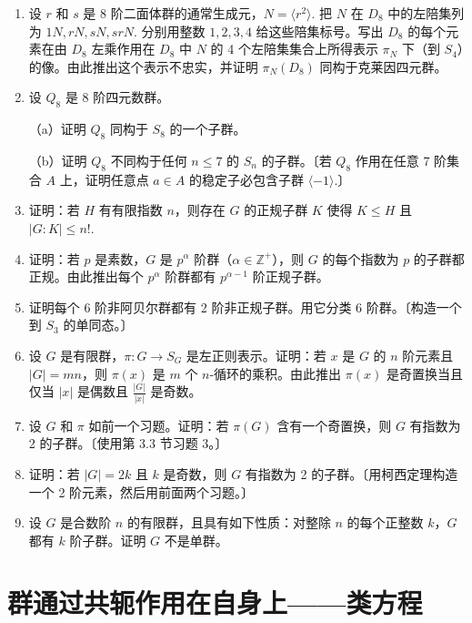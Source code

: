 \begin{enumerate}
\item 设 \(r\) 和 \(s\) 是 8 阶二面体群的通常生成元，\(N = \langle r^2 \rangle\). 把 \(N\) 在 \(D_8\) 中的左陪集列为 \(1N, rN, sN, srN\). 分别用整数 \(1, 2, 3, 4\) 给这些陪集标号。写出 \(D_8\) 的每个元素在由 \(D_8\) 左乘作用在 \(D_8\) 中 \(N\) 的 4 个左陪集集合上所得表示 \(\pi_N\) 下（到 \(S_4\)）的像。由此推出这个表示不忠实，并证明 \(\pi_N(D_8)\) 同构于克莱因四元群。

\item 设 \(Q_8\) 是 8 阶四元数群。

（a）证明 \(Q_8\) 同构于 \(S_8\) 的一个子群。

（b）证明 \(Q_8\) 不同构于任何 \(n \leq 7\) 的 \(S_n\) 的子群。〔若 \(Q_8\) 作用在任意 7 阶集合 \(A\) 上，证明任意点 \(a \in A\) 的稳定子必包含子群 \(\langle -1 \rangle\).〕

\item 证明：若 \(H\) 有有限指数 \(n\)，则存在 \(G\) 的正规子群 \(K\) 使得 \(K \leq H\) 且 \(|G : K| \leq n!\).

\item 证明：若 \(p\) 是素数，\(G\) 是 \(p^\alpha\) 阶群（\(\alpha \in \mathbb{Z}^+\)），则 \(G\) 的每个指数为 \(p\) 的子群都正规。由此推出每个 \(p^\alpha\) 阶群都有 \(p^{\alpha-1}\) 阶正规子群。

\item 证明每个 6 阶非阿贝尔群都有 2 阶非正规子群。用它分类 6 阶群。〔构造一个到 \(S_3\) 的单同态。〕

\item 设 \(G\) 是有限群，\(\pi : G \to S_G\) 是左正则表示。证明：若 \(x\) 是 \(G\) 的 \(n\) 阶元素且 \(|G| = mn\)，则 \(\pi(x)\) 是 \(m\) 个 \(n\)-循环的乘积。由此推出 \(\pi(x)\) 是奇置换当且仅当 \(|x|\) 是偶数且 \(\frac{|G|}{|x|}\) 是奇数。

\item 设 \(G\) 和 \(\pi\) 如前一个习题。证明：若 \(\pi(G)\) 含有一个奇置换，则 \(G\) 有指数为 2 的子群。〔使用第 3.3 节习题 3。〕

\item 证明：若 \(|G| = 2k\) 且 \(k\) 是奇数，则 \(G\) 有指数为 2 的子群。〔用柯西定理构造一个 2 阶元素，然后用前面两个习题。〕

\item 设 \(G\) 是合数阶 \(n\) 的有限群，且具有如下性质：对整除 \(n\) 的每个正整数 \(k\)，\(G\) 都有 \(k\) 阶子群。证明 \(G\) 不是单群。
\end{enumerate}

\section{群通过共轭作用在自身上——类方程}

